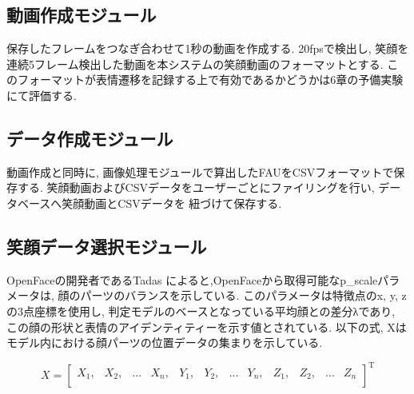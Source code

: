 \subsection{動画作成モジュール}
保存したフレームをつなぎ合わせて1秒の動画を作成する.
20fpsで検出し, 笑顔を連続5フレーム検出した動画を本システムの笑顔動画のフォーマットとする.
このフォーマットが表情遷移を記録する上で有効であるかどうかは6章の予備実験にて評価する.

\subsection{データ作成モジュール}
動画作成と同時に, 画像処理モジュールで算出したFAUをCSVフォーマットで保存する.
笑顔動画およびCSVデータをユーザーごとにファイリングを行い, データベースへ笑顔動画とCSVデータを
紐づけて保存する.

\subsection{笑顔データ選択モジュール}
OpenFaceの開発者であるTadas \cite{tadas} によると,OpenFaceから取得可能なp\_scaleパラメータは,
顔のパーツのバランスを示している.
このパラメータは特徴点のx, y, zの3点座標を使用し, 判定モデルのベースとなっている平均顔との差分λであり,
この顔の形状と表情のアイデンティティーを示す値とされている.
以下の式, Xはモデル内における顔パーツの位置データの集まりを示している.

\begin{equation}
  X =
  \left[
  \begin{array}{cccccccccccc}
  X_1, & X_2, & ... & X_n, & Y_1, & Y_2, & ... & Y_n, & Z_1, & Z_2, & ... & Z_n \\
  \end{array}
  \right]
  ^{\mathrm{T}}
\end{equation}

